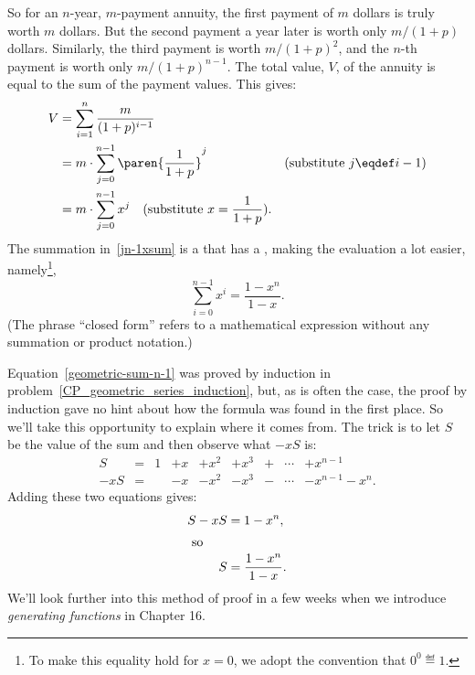 So for an $n$-year, $m$-payment annuity, the first payment of $m$ dollars
is truly worth $m$ dollars.  But the second payment a year later is worth
only $m/(1+p)$ dollars.  Similarly, the third payment is worth
$m/(1+p)^2$, and the $n$-th payment is worth only $m/(1+p)^{n-1}$.  The
total value, $V$, of the annuity is equal to the sum of the payment
values.  This gives:
\begin{align}
  V & = \sum_{i=1}^n \frac{m}{(1+p)^{i-1}}\notag\\
  & = m \cdot \sum_{j=0}^{n-1} \paren{\frac{1}{1+p}}^j & \text{(substitute $j \eqdef i-1$)}\notag\\
  & = m \cdot \sum_{j=0}^{n-1} x^j \quad (\mbox{substitute} \ x =
  \frac{1}{1+p}).\label{jn-1xsum}
\end{align}
The summation in~\eqref{jn-1xsum} is a  that has a
, making the evaluation a lot easier, namely\footnote{To
  make this equality hold for $x=0$, we adopt the convention that $0^0
  \eqdef 1$.},
\begin{equation}\label{geometric-sum-n-1}
\sum_{i=0}^{n-1} x^i = \frac{1- x^n}{1 - x}.
\end{equation}
(The phrase ``closed form'' refers to a mathematical expression without
any summation or product notation.)

Equation~\eqref{geometric-sum-n-1} was proved by induction in
problem~\ref{CP_geometric_series_induction}, but, as is often the case,
the proof by induction gave no hint about how the formula was found in the
first place.  So we'll take this opportunity to explain where it comes
from.  The trick is to let $S$ be the value of the sum and then observe
what $-xS$ is:
\[\begin{array}{rclllllcl}
  S & = & 1 & +  x & + x^2 & + x^3 & + &\cdots & + x^{n-1} \\
-xS & = &   & -  x & - x^2 & - x^3 & - &\cdots & - x^{n-1} - x^{n}.
\end{array}\]
Adding these two equations gives:
\begin{align*}
S-xS  & =  1 - x^n, \\
\intertext{  so}
S     & = \frac{1 - x^n}{1 - x}.
\end{align*}
We'll look further into this method of proof in a few weeks when we
introduce \emph{generating functions} in 
Chapter 16.%


